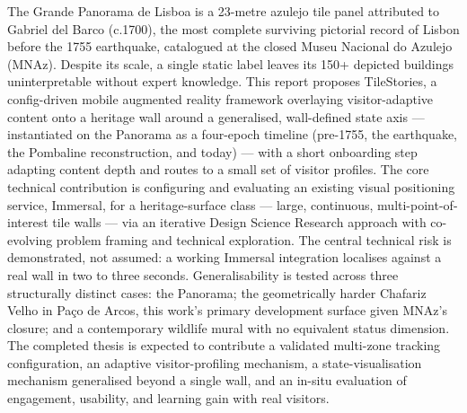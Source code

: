 
%

The Grande Panorama de Lisboa is a 23-metre azulejo tile panel attributed
to Gabriel del Barco (c.1700), the most complete surviving pictorial
record of Lisbon before the 1755 earthquake, catalogued at the closed
Museu Nacional do Azulejo (MNAz). Despite its scale, a single static
label leaves its 150+ depicted buildings uninterpretable without expert
knowledge. This report proposes TileStories, a
config-driven mobile augmented reality framework overlaying
visitor-adaptive content onto a heritage wall around a generalised,
wall-defined state axis --- instantiated on the Panorama as a four-epoch
timeline (pre-1755, the earthquake, the Pombaline reconstruction, and
today) --- with a short onboarding step adapting content depth and
routes to a small set of visitor profiles. The core technical
contribution is configuring and evaluating an existing
visual positioning service, Immersal, for a heritage-surface class ---
large, continuous, multi-point-of-interest tile walls --- via an
iterative Design Science Research approach with co-evolving problem
framing and technical exploration. The central technical risk is
demonstrated, not assumed: a working Immersal integration localises
against a real wall in two to three seconds. Generalisability is tested
across three structurally distinct cases: the Panorama; the
geometrically harder Chafariz Velho in Paço de Arcos, this work's
primary development surface given MNAz's closure; and a contemporary
wildlife mural with no equivalent status dimension. The completed thesis
is expected to contribute a validated multi-zone tracking configuration,
an adaptive visitor-profiling mechanism, a state-visualisation mechanism
generalised beyond a single wall, and an in-situ evaluation of
engagement, usability, and learning gain with real visitors.
 
